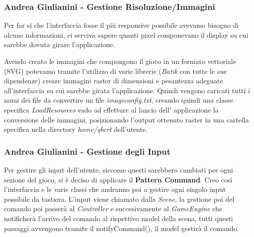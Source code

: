 \documentclass[a4paper,12pt, hidelinks]{report}
\begin{document}
\begin{flushright}
\item\subsubsection{Andrea Giulianini - Gestione Risoluzione/Immagini}
\end{flushright}

Per far si che l'interfaccia fosse il più responsive possibile avevamo bisogno di alcune informazioni, ci serviva sapere quanti pixel componevano il display su cui sarebbe dovuta girare l'applicazione.

Avendo creato le immagini che compongono il gioco in un formato vettoriale (SVG) potevamo tramite l'utilizzo di varie librerie (\emph{Batik} con tutte le sue dipendenze) creare immagini raster di dimensioni e pesantezza adeguate all'interfaccia su cui sarebbe girata l'applicazione. Quindi vengono caricati tutti i nomi dei file da convertire un file \emph{imageconfig.txt}, creando quindi una classe specifica \emph{LoadResources} vado ad effetture al lancio dell' applicazione la conversione delle immagini, posizionando l'output ottenuto raster in una cartella specifica nella directory \emph{home/qbert} dell'utente.

\begin{flushright}
\item\subsubsection{Andrea Giulianini - Gestione degli Input}
\end{flushright}

Per gestire gli input dell'utente, siccome questi sarebbero cambiati per ogni sezione del gioco, si è deciso di applicare il \textbf{Pattern Command}. Creo così l'interfaccia e le varie classi che andranno poi a gestire ogni singolo input possibile da tastiera. L'input viene chiamato dalla \emph{Scene}, la gestione poi del comando poi passerà al \emph{Controller} e succesivamente al \emph{GameEngine} che notificherà l'arrivo del comando al rispettivo model della scena, tutti questi passaggi avvengono tramite il notifyCommand(), il model gestirà il comando.
\end{document}
